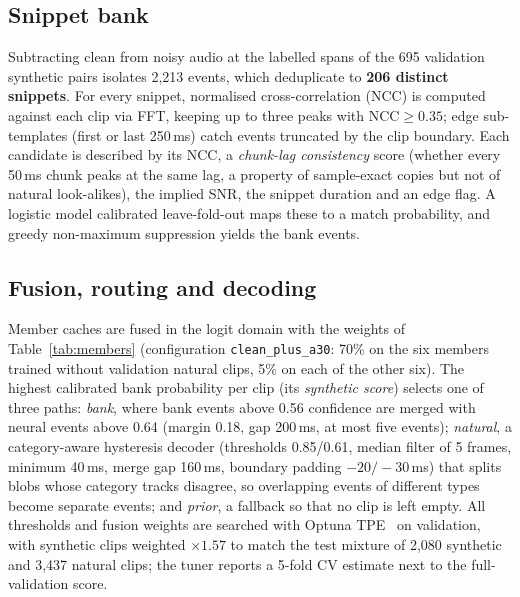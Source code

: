 \documentclass[conference]{IEEEtran}
\begin{document}
\subsection{Snippet bank}
Subtracting clean from noisy audio at the labelled spans of the 695 validation synthetic pairs isolates 2,213
events, which deduplicate to \textbf{206 distinct snippets}. For every snippet, normalised cross-correlation (NCC)
is computed against each clip via FFT, keeping up to three peaks with $\text{NCC}\geq0.35$; edge sub-templates
(first or last 250\,ms) catch events truncated by the clip boundary. Each candidate is described by its NCC, a
\emph{chunk-lag consistency} score (whether every 50\,ms chunk peaks at the same lag, a property of sample-exact
copies but not of natural look-alikes), the implied SNR, the snippet duration and an edge flag. A logistic model
calibrated leave-fold-out maps these to a match probability, and greedy non-maximum suppression yields the bank
events.

\subsection{Fusion, routing and decoding}
Member caches are fused in the logit domain with the weights of Table~\ref{tab:members} (configuration
\texttt{clean\_plus\_a30}: 70\% on the six members trained without validation natural clips, 5\% on each of the
other six). The highest calibrated bank probability per clip (its \emph{synthetic score}) selects one of three
paths: \emph{bank}, where bank events above 0.56 confidence are merged with neural events above 0.64 (margin 0.18,
gap 200\,ms, at most five events); \emph{natural}, a category-aware hysteresis decoder (thresholds 0.85/0.61, median
filter of 5 frames, minimum 40\,ms, merge gap 160\,ms, boundary padding $-20/-30$\,ms) that splits blobs whose
category tracks disagree, so overlapping events of different types become separate events; and \emph{prior}, a
fallback so that no clip is left empty. All thresholds and fusion weights are searched with Optuna
TPE~\cite{optuna} on validation, with synthetic clips weighted $\times1.57$ to match the test mixture of 2,080
synthetic and 3,437 natural clips; the tuner reports a 5-fold CV estimate next to the full-validation score.
\end{document}
